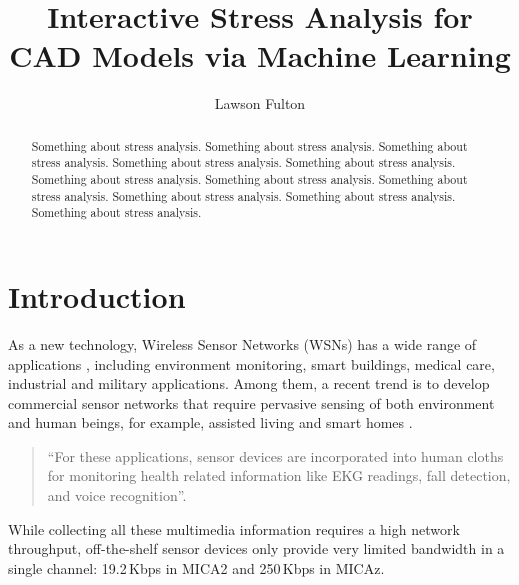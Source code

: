 \documentclass[acmtog, authorversion]{acmart}
\begin{document}
\title{Interactive Stress Analysis for CAD Models
	via Machine Learning} 

\author{Lawson Fulton}


\renewcommand\shortauthors{Fulton}

\begin{abstract}
Something about stress analysis. Something about stress analysis. Something about stress analysis. Something about stress analysis. Something about stress analysis. Something about stress analysis. Something about stress analysis. Something about stress analysis. Something about stress analysis. Something about stress analysis. Something about stress analysis. 
\end{abstract}


%
%





\maketitle

\section{Introduction}

As a new technology, Wireless Sensor Networks (WSNs) has a wide
range of applications \cite{Culler-01, Bahl-02, Akyildiz-01}, including
environment monitoring, smart buildings, medical care, industrial and
military applications. Among them, a recent trend is to develop
commercial sensor networks that require pervasive sensing of both
environment and human beings, for example, assisted living
\cite{Akyildiz-02, Harvard-01,CROSSBOW} and smart homes
\cite{Harvard-01, Adya-01,CROSSBOW}.
\begin{quote}
	``For these applications, sensor devices are incorporated into human
	cloths \cite{Natarajan-01, Zhou-06, Bahl-02, Adya-01} for monitoring
	health related information like EKG readings, fall detection, and
	voice recognition''.
\end{quote}
While collecting all these multimedia information
\cite{Akyildiz-02} requires a high network throughput, off-the-shelf
sensor devices only provide very limited bandwidth in a single
channel: 19.2\,Kbps in MICA2 \cite{Bahl-02} and 250\,Kbps in MICAz.
\end{document}

